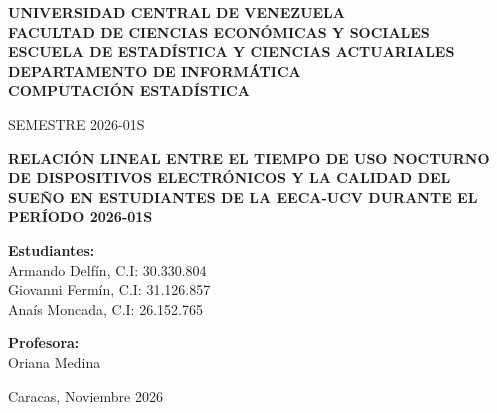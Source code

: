 \documentclass[12pt, letterpaper]{article}
\begin{document}
\begin{titlepage}
    \centering
    {\bfseries UNIVERSIDAD CENTRAL DE VENEZUELA\\
    FACULTAD DE CIENCIAS ECONÓMICAS Y SOCIALES\\
    ESCUELA DE ESTADÍSTICA Y CIENCIAS ACTUARIALES\\
    DEPARTAMENTO DE INFORMÁTICA\\
    COMPUTACIÓN ESTADÍSTICA\par}
    \vspace{0.3cm}
    {\small SEMESTRE 2026-01S\par}
    
    \vspace{3.0cm}
    {\bfseries\large RELACIÓN LINEAL ENTRE EL TIEMPO DE USO NOCTURNO DE DISPOSITIVOS ELECTRÓNICOS Y LA CALIDAD DEL SUEÑO EN ESTUDIANTES DE LA EECA-UCV DURANTE EL PERÍODO 2026-01S\par}
    
    \vspace{3.5cm}
    \noindent
    \begin{minipage}[t]{0.55\textwidth}
        \raggedright
        \textbf{Estudiantes:}\\[0.15cm]
        Armando Delfín, C.I: 30.330.804\\
        Giovanni Fermín, C.I: 31.126.857\\
        Anaís Moncada, C.I: 26.152.765
    \end{minipage}%
    \hfill
    \begin{minipage}[t]{0.38\textwidth}
        \textbf{Profesora:}\\[0.15cm]
        Oriana Medina
    \end{minipage}
    
    \vfill
    {\normalsize Caracas, Noviembre 2026\par}
\end{titlepage}

\begin{singlespace}
\tableofcontents
\end{singlespace}
\newpage

\setcounter{page}{1}

\end{document}
